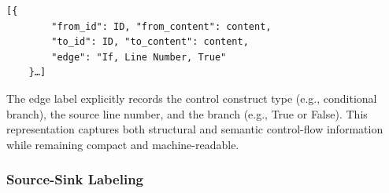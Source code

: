 \begin{verbatim}
[{
		"from_id": ID, "from_content": content, 
		"to_id": ID, "to_content": content,
		"edge": "If, Line Number, True"
	}…]
\end{verbatim}


The edge label explicitly records the control construct type (e.g., conditional branch), the source line number, and the branch (e.g., True or False). This representation captures both structural and semantic control-flow information while remaining compact and machine-readable.




\subsubsection{Source-Sink Labeling}



